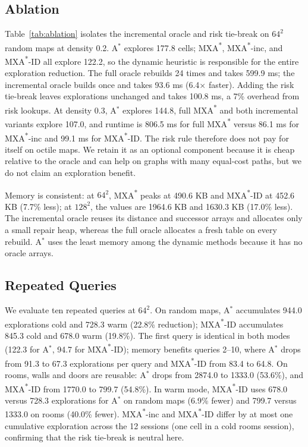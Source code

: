 \documentclass[conference]{IEEEtran}
\newcommand{\MXA}{MXA\textsuperscript{*}}
\newcommand{\MXAID}{MXA\textsuperscript{*}-ID}
\newcommand{\MXAinc}{MXA\textsuperscript{*}-inc}
\begin{document}
\subsection{Ablation}
Table~\ref{tab:ablation} isolates the incremental oracle and risk tie-break on $64^2$ random maps at density 0.2. A$^*$ explores 177.8 cells; \MXA{}, \MXAinc{}, and \MXAID{} all explore 122.2, so the dynamic heuristic is responsible for the entire exploration reduction. The full oracle rebuilds 24 times and takes 599.9 ms; the incremental oracle builds once and takes 93.6 ms (6.4$\times$ faster). Adding the risk tie-break leaves explorations unchanged and takes 100.8 ms, a 7\% overhead from risk lookups. At density 0.3, A$^*$ explores 144.8, full \MXA{} and both incremental variants explore 107.0, and runtime is 806.5 ms for full \MXA{} versus 86.1 ms for \MXAinc{} and 99.1 ms for \MXAID. The risk rule therefore does not pay for itself on octile maps. We retain it as an optional component because it is cheap relative to the oracle and can help on graphs with many equal-cost paths, but we do not claim an exploration benefit.

Memory is consistent: at $64^2$, \MXA{} peaks at 490.6 KB and \MXAID{} at 452.6 KB (7.7\% less); at $128^2$, the values are 1964.6 KB and 1630.3 KB (17.0\% less). The incremental oracle reuses its distance and successor arrays and allocates only a small repair heap, whereas the full oracle allocates a fresh table on every rebuild. A$^*$ uses the least memory among the dynamic methods because it has no oracle arrays.



\subsection{Repeated Queries}
We evaluate ten repeated queries at $64^2$. On random maps, A$^*$ accumulates 944.0 explorations cold and 728.3 warm (22.8\% reduction); \MXAID{} accumulates 845.3 cold and 678.0 warm (19.8\%). The first query is identical in both modes (122.3 for A$^*$, 94.7 for \MXAID{}); memory benefits queries 2--10, where A$^*$ drops from 91.3 to 67.3 explorations per query and \MXAID{} from 83.4 to 64.8. On rooms, walls and doors are reusable: A$^*$ drops from 2874.0 to 1333.0 (53.6\%), and \MXAID{} from 1770.0 to 799.7 (54.8\%). In warm mode, \MXAID{} uses 678.0 versus 728.3 explorations for A$^*$ on random maps (6.9\% fewer) and 799.7 versus 1333.0 on rooms (40.0\% fewer). \MXAinc{} and \MXAID{} differ by at most one cumulative exploration across the 12 sessions (one cell in a cold rooms session), confirming that the risk tie-break is neutral here.
\end{document}
